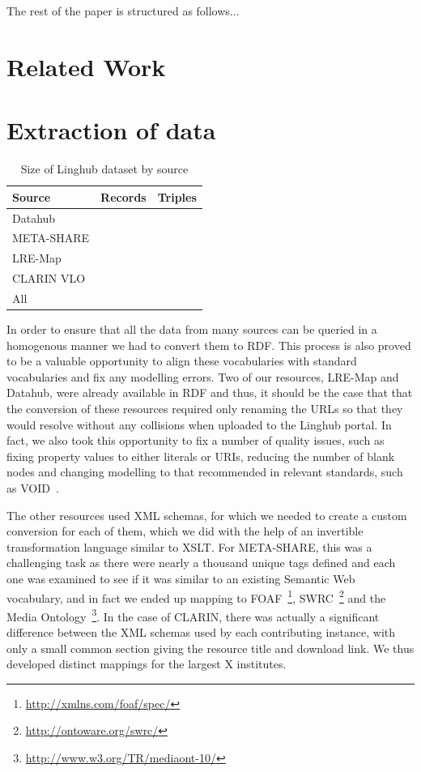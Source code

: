 \documentclass[11pt]{article}
\begin{document}
The rest of the paper is structured as follows...

\section{Related Work}

\section{Extraction of data}

\begin{table}
	\centering
	\begin{tabular}{p{30mm}|cc}
	Source               & Records    & Triples  \\
	\hline
	Datahub              &            &          \\
	META-SHARE           &            &          \\
	LRE-Map              &            &          \\
	CLARIN VLO           &            &          \\
	\hline
	All                  &            &          \\
	\end{tabular}
	\caption{Size of Linghub dataset by source\label{tab:size}}
\end{table}

In order to ensure that all the data from many sources can be queried in a
homogenous manner we had to convert them to RDF. This process is also proved to
be a valuable opportunity to align these vocabularies with standard vocabularies
and fix any modelling errors. Two of our resources, LRE-Map and Datahub, were already available in RDF
and thus, it should be the case that that the conversion of these resources
required only renaming the URLs so that they would resolve without any
collisions when uploaded to the Linghub portal. In fact, we also took this
opportunity to fix a number of quality issues, such as fixing property values to
either literals or URIs, reducing the number of blank nodes and changing
modelling to that recommended in relevant standards, such as
VOID~\cite{alexander2011describing}. 

The other resources used XML schemas, for which we needed to create a custom
conversion for each of them, which we did with the help of an invertible
transformation language similar to XSLT. For META-SHARE, this was a challenging
task as there were nearly a thousand unique tags defined and each one was
examined to see if it was similar to an existing Semantic Web vocabulary, and in
fact we ended up mapping to FOAF~\footnote{\url{http://xmlns.com/foaf/spec/}},
SWRC~\footnote{\url{http://ontoware.org/swrc/}} and the Media
Ontology~\footnote{\url{http://www.w3.org/TR/mediaont-10/}}. In the case of
CLARIN, there was actually a significant difference between the XML schemas used
by each contributing instance, with only a small common section giving the
resource title and download link. We thus developed distinct mappings for the
largest X institutes.
\end{document}
